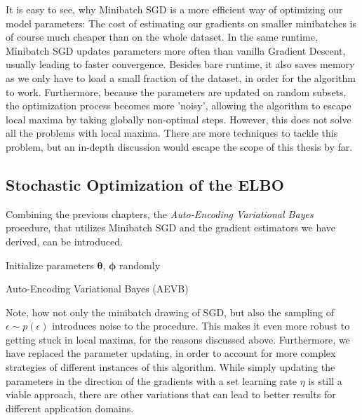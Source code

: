 \documentclass[12pt]{report}
\theoremstyle{definition}
\begin{document}
It is easy to see, why Minibatch SGD is a more efficient way of optimizing our model parameters: The cost of estimating our gradients on smaller minibatches is of course much cheaper than on the whole dataset. In the same runtime, Minibatch SGD updates parameters more often than vanilla Gradient Descent, usually leading to faster convergence. Besides bare runtime, it also saves memory as we only have to load a small fraction of the dataset, in order for the algorithm to work. Furthermore, because the  parameters are updated on random subsets, the optimization process becomes more 'noisy', allowing the algorithm to escape local maxima by taking globally non-optimal steps. However, this does not solve all the problems with local maxima. There are more techniques to tackle this problem, but an in-depth discussion would escape the scope of this thesis by far.

\subsection{Stochastic Optimization of the ELBO}
Combining the previous chapters, the \emph{Auto-Encoding Variational Bayes} procedure, that utilizes Minibatch SGD and the gradient estimators we have derived, can be introduced.

\begin{algorithm}[H]
\SetAlgoLined
Initialize parameters $\pmb{\theta}$, $\pmb{\phi}$ randomly\\
\caption{Auto-Encoding Variational Bayes (AEVB)}
\end{algorithm}
Note, how not only the minibatch drawing of SGD, but also the sampling of $\epsilon \sim p(\epsilon)$ introduces noise to the procedure. This makes it even more robust to getting stuck in local maxima, for the reasons discussed above. Furthermore, we have replaced the parameter updating, in order to account for more complex strategies of different instances of this algorithm. While simply updating the parameters in the direction of the gradients with a set learning rate $\eta$ is still a viable approach, there are other variations that can lead to better results for different application domains.
\end{document}
